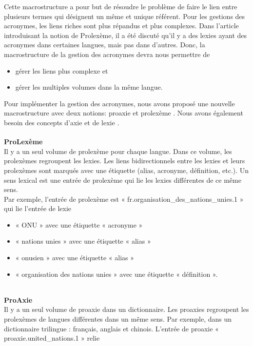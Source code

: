 \documentclass[10pt,a4paper,twoside]{article}
\begin{document}
Cette macrostructure a pour but de résoudre le problème de faire le lien entre plusieurs termes qui désignent un même et unique référent. Pour les gestions des acronymes, les liens riches sont plus répandus et plus complexes. Dans l'article introduisant la notion de Prolexème, il a été discuté qu’il y a des lexies ayant des acronymes dans certaines langues, mais pas dans d'autres. Donc, la macrostructure de la gestion des acronymes devra nous permettre de  \\
\begin{itemize}
\item gérer les liens  plus complexe et
\item gérer les multiples volumes dans la même langue. 
\end{itemize}
Pour implémenter la gestion des acronymes, nous avons proposé une nouvelle macrostructure avec deux notions: proaxie et prolexème \cite{MT00}. Nous avons également besoin des concepts d'axie \cite{MTMMEP00} et de lexie \cite{MLCAPA00}. \\
\\
\textbf{ProLexème}\\
Il y a un seul volume de prolexème pour chaque langue. Dans ce volume, les prolexèmes regroupent les lexies. Les liens bidirectionnels entre les lexies et leurs prolexèmes sont marqués avec une étiquette (alias, acronyme, définition, etc.). Un sens lexical est une entrée de prolexème qui lie les lexies différentes de ce même sens. \\
Par exemple, l’entrée de prolexème est « fr.organisation\_des\_nations\_unies.1 » qui lie l’entrée de lexie 
\begin{itemize}
\item « ONU » avec une étiquette « acronyme »
\item « nations unies » avec une étiquette « alias »
\item « onusien » avec une étiquette « alias »
\item « organisation des nations unies » avec une étiquette « définition ».
\end{itemize}
\quad  \\
\textbf{ProAxie}\\
Il y a un seul volume de proaxie dans un dictionnaire. Les proaxies regroupent les prolexèmes de langues différentes dans un même sens. Par exemple, dans un dictionnaire trilingue : français, anglais et chinois. L’entrée de proaxie « proaxie.united\_nations.1 » relie 
\end{document}
